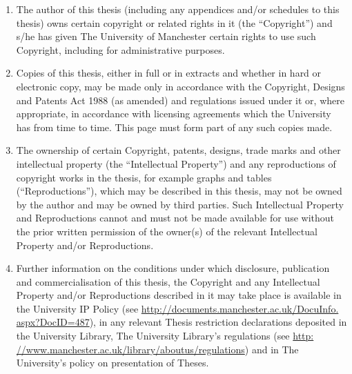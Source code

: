 \begin{enumerate}[i]
  \item The author of this thesis (including any appendices and/or schedules to this
  thesis) owns certain copyright or related rights in it (the “Copyright”) and s/he
  has given The University of Manchester certain rights to use such Copyright,
  including for administrative purposes.
  \item Copies of this thesis, either in full or in extracts and whether in hard or electronic
  copy, may be made only in accordance with the Copyright, Designs and Patents
  Act 1988 (as amended) and regulations issued under it or, where appropriate, in
  accordance with licensing agreements which the University has from time to
  time. This page must form part of any such copies made.
  \item The ownership of certain Copyright, patents, designs, trade marks and other
  intellectual property (the “Intellectual Property”) and any reproductions of
  copyright works in the thesis, for example graphs and tables (“Reproductions”),
  which may be described in this thesis, may not be owned by the author and may
  be owned by third parties. Such Intellectual Property and Reproductions cannot
  and must not be made available for use without the prior written permission of
  the owner(s) of the relevant Intellectual Property and/or Reproductions.
  \item Further information on the conditions under which disclosure, publication
  and commercialisation of this thesis, the Copyright and any Intellectual Property and/or Reproductions described in it may take place is available in the
  University IP Policy (see \url{http://documents.manchester.ac.uk/DocuInfo.
  aspx?DocID=487}), in any relevant Thesis restriction declarations deposited
  in the University Library, The University Library’s regulations (see \url{http:
  //www.manchester.ac.uk/library/aboutus/regulations}) and in The University’s policy on presentation of Theses.
\end{enumerate}
